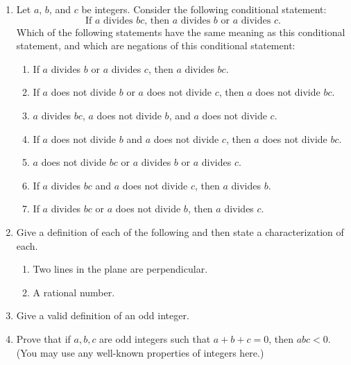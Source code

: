 \documentclass[12pt]{article}
\begin{document}
\begin{enumerate}
\newpage %
\item  Let $a$, $b$, and $c$ be integers.
  Consider the following conditional statement:
  \[\mbox{If $a$ divides $bc$, then $a$ divides $b$ or $a$ divides $c$.}\]
  Which of the following statements have the same meaning as this conditional statement, and which are negations of this
  conditional statement:
  \begin{enumerate}
   \item If $a$ divides $b$ or $a$ divides $c$, then $a$ divides $bc$.
   \item If $a$ does not divide $b$ or $a$ does not divide $c$, then $a$ does not divide $bc$.
   \item $a$ divides $bc$, $a$ does not divide $b$, and $a$ does not divide $c$.
   \item If $a$ does not divide $b$ and $a$ does not divide $c$, then $a$ does not divide $bc$.
   \item $a$ does not divide $bc$ or $a$  divides $b$ or $a$  divides $c$.
   \item If $a$ divides $bc$ and $a$ does not divide $c$, then $a$ divides $b$.
   \item If $a$ divides $bc$ or $a$ does not divide $b$, then $a$ divides $c$.
  \end{enumerate}

\item   Give a definition of each of the following and then state a characterization of each.
 \begin{enumerate}
   \item  Two lines in the plane are perpendicular.
   \item  A rational number.
\end{enumerate}

\item Give a valid definition of an odd integer.
 
 \item Prove that if $a,b,c$ are odd integers such that $a+b+c=0$, then $abc<0$.
   (You may use any well-known properties of integers here.)


\end{enumerate}
\end{document}

